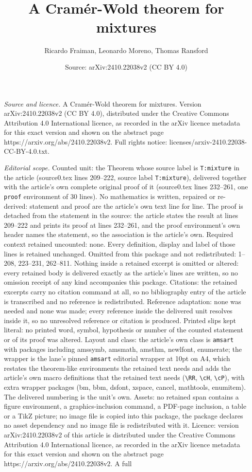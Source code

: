 \documentclass[10pt,a4paper]{amsart}
\title[A Cram\'er-Wold theorem for mixtures]{A Cram\'er-Wold theorem for mixtures}
\author{Ricardo Fraiman, Leonardo Moreno, Thomas Ransford}
\date{Source: arXiv:2410.22038v2 (CC BY 4.0)}
\begin{document}
\maketitle

\noindent\emph{Source and licence.} A Cram\'er-Wold theorem for mixtures. Version arXiv:2410.22038v2 (CC BY 4.0), distributed under the Creative Commons Attribution 4.0 International licence, as recorded in the arXiv licence metadata for this exact version and shown on the abstract page https://arxiv.org/abs/2410.22038v2. Full rights notice: licenses/arxiv-2410.22038-CC-BY-4.0.txt.\par\smallskip

\noindent\textit{Editorial scope.} Counted unit: the Theorem whose source label is \texttt{T:mixture} in the article (source0.tex lines 209--222, source label \texttt{T:mixture}), delivered together with the article's own complete original proof of it (source0.tex lines 232--261, one \texttt{proof} environment of 30 lines). No mathematics is written, repaired or re-derived: statement and proof are the article's own text line for line. The proof is detached from the statement in the source: the article states the result at lines 209--222 and prints its proof at lines 232--261, and the proof environment's own header names the statement, so the association is the article's own. Required context retained uncounted: none. Every definition, display and label of those lines is retained unchanged. Omitted from this package and not redistributed: 1--208, 223--231, 262--811. Nothing inside a retained excerpt is omitted or altered: every retained body is delivered exactly as the article's lines are written, so no omission receipt of any kind accompanies this package. Citations: the retained excerpts carry no citation command at all, so no bibliography entry of the article is transcribed and no reference is redistributed. Reference adaptation: none was needed and none was made; every reference inside the delivered unit resolves inside it, so no unresolved reference or citation is produced. Printed slips kept literal: no printed word, symbol, hypothesis or number of the counted statement or of its proof was altered. Layout and class: the article's own class is \texttt{amsart} with packages including amssymb, amsmath, amsthm, newlfont, enumerate; the wrapper is the lane's pinned \texttt{amsart} editorial wrapper at 10pt on A4, which restates the theorem-like environments the retained text needs and adds the article's own macro definitions that the retained text needs (\texttt{\textbackslash RR}, \texttt{\textbackslash cH}, \texttt{\textbackslash cP}), with extra wrapper packages (bm, bbm, dsfont, xspace, cancel, mathtools, enumitem). The delivered numbering is the unit's own. Assets: no retained span contains a figure environment, a graphics-inclusion command, a PDF-page inclusion, a table or a TikZ picture; no image file is copied into this package, the package declares no asset dependency and no image file is redistributed with it. Licence: version arXiv:2410.22038v2 of this article is distributed under the Creative Commons Attribution 4.0 International licence, as recorded in the arXiv licence metadata for this exact version and shown on the abstract page https://arxiv.org/abs/2410.22038v2. A full 
\end{document}
